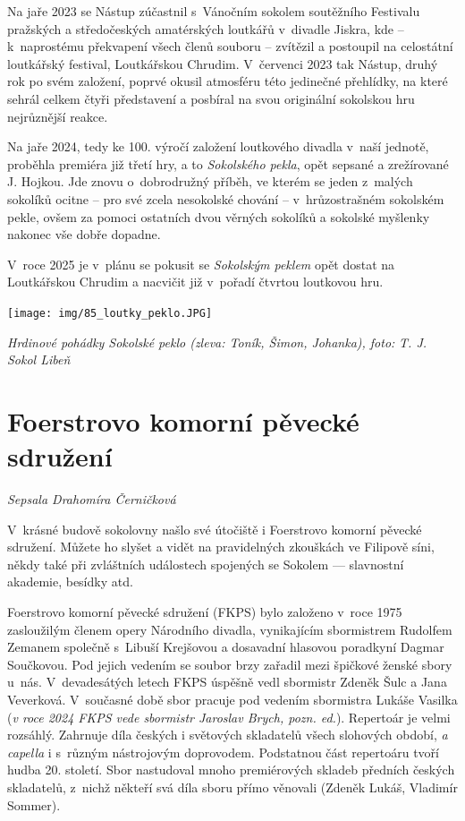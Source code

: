 \documentclass[a5paper, 11pt, twoside]{article}
\begin{document}
Na jaře 2023 se Nástup zúčastnil s~Vánočním sokolem soutěžního Festivalu
pražských a středočeských amatérských loutkářů v~divadle Jiskra, kde --
k~naprostému překvapení všech členů souboru -- zvítězil a postoupil na
celostátní loutkářský festival, Loutkářskou Chrudim. V~červenci 2023 tak
Nástup, druhý rok po svém založení, poprvé okusil atmosféru této
jedinečné přehlídky, na které sehrál celkem čtyři představení a posbíral
na svou originální sokolskou hru nejrůznější reakce.

Na jaře 2024, tedy ke 100. výročí založení loutkového divadla v~naší
jednotě, proběhla premiéra již třetí hry, a to \textit{Sokolského pekla},
opět sepsané a zrežírované J. Hojkou. Jde znovu o~dobrodružný příběh, ve
kterém se jeden z~malých sokolíků ocitne -- pro své zcela nesokolské
chování -- v~hrůzostrašném sokolském pekle, ovšem za pomoci ostatních
dvou věrných sokolíků a sokolské myšlenky nakonec vše dobře dopadne.

V~roce 2025 je v~plánu se pokusit se \textit{Sokolským peklem} opět dostat
na Loutkářskou Chrudim a nacvičit již v~pořadí čtvrtou loutkovou hru.

 \texttt{[image: img/85\_loutky\_peklo.JPG]}

\textit{Hrdinové pohádky Sokolské peklo (zleva: Toník, Šimon, Johanka),
foto:} \textit{T. J. Sokol Libeň}

\section{Foerstrovo komorní pěvecké
sdružení}

\textit{Sepsala Drahomíra Černičková}

V~krásné budově sokolovny našlo své útočiště i Foerstrovo komorní
pěvecké sdružení. Můžete ho slyšet a vidět na pravidelných zkouškách ve
Filipově síni, někdy také při zvláštních událostech spojených se Sokolem
--- slavnostní akademie, besídky atd.

Foerstrovo komorní pěvecké sdružení (FKPS) bylo založeno v~roce 1975
zasloužilým členem opery Národního divadla, vynikajícím sbormistrem
Rudolfem Zemanem společně s~Libuší Krejšovou a dosavadní hlasovou
poradkyní Dagmar Součkovou. Pod jejich vedením se soubor brzy zařadil
mezi špičkové ženské sbory u~nás. V~devadesátých letech FKPS úspěšně
vedl sbormistr Zdeněk Šulc a Jana Veverková. V~současné době sbor
pracuje pod vedením sbormistra Lukáše Vasilka (\textit{v roce 2024 FKPS
vede sbormistr Jaroslav Brych, pozn. ed.}). Repertoár je velmi rozsáhlý.
Zahrnuje díla českých i světových skladatelů všech slohových období,
\textit{a capella} i s~různým nástrojovým doprovodem. Podstatnou část
repertoáru tvoří hudba 20. století. Sbor nastudoval mnoho premiérových
skladeb předních českých skladatelů, z~nichž někteří svá díla sboru
přímo věnovali (Zdeněk Lukáš, Vladimír Sommer).
\end{document}
